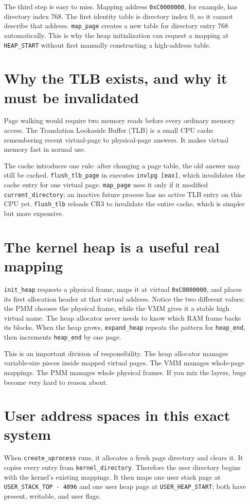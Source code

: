 The third step is easy to miss. Mapping address \texttt{0xC0000000}, for example, has directory index 768. The first identity table is directory index 0, so it cannot describe that address. \texttt{map\_page} creates a new table for directory entry 768 automatically. This is why the heap initialization can request a mapping at \texttt{HEAP\_START} without first manually constructing a high-address table.

\section{Why the TLB exists, and why it must be invalidated}
Page walking would require two memory reads before every ordinary memory access. The Translation Lookaside Buffer (TLB) is a small CPU cache remembering recent virtual-page to physical-page answers. It makes virtual memory fast in normal use.

The cache introduces one rule: after changing a page table, the old answer may still be cached. \texttt{flush\_tlb\_page} in  executes \texttt{invlpg [eax]}, which invalidates the cache entry for one virtual page. \texttt{map\_page} uses it only if it modified \texttt{current\_directory}; an inactive future process has no active TLB entry on this CPU yet. \texttt{flush\_tlb} reloads CR3 to invalidate the entire cache, which is simpler but more expensive.

\section{The kernel heap is a useful real mapping}
\texttt{init\_heap} requests a physical frame, maps it at virtual \texttt{0xC0000000}, and places its first allocation header at that virtual address. Notice the two different values: the PMM chooses the physical frame, while the VMM gives it a stable high virtual name. The heap allocator never needs to know which RAM frame backs its blocks. When the heap grows, \texttt{expand\_heap} repeats the pattern for \texttt{heap\_end}, then increments \texttt{heap\_end} by one page.

This is an important division of responsibility. The heap allocator manages variable-size pieces inside mapped virtual pages. The VMM manages whole-page mappings. The PMM manages whole physical frames. If you mix the layers, bugs become very hard to reason about.

\section{User address spaces in this exact system}
When \texttt{create\_uprocess} runs, it allocates a fresh page directory and clears it. It copies every entry from \texttt{kernel\_directory}. Therefore the user directory begins with the kernel's existing mappings. It then maps one user stack page at \texttt{USER\_STACK\_TOP - 4096} and one user heap page at \texttt{USER\_HEAP\_START}; both have present, writable, and user flags.


